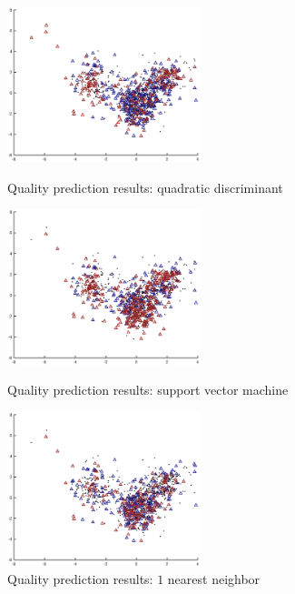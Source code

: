 \documentclass[twoside]{article}
\begin{document}
\begin{multicols}{2}
\begin{figure}[H]
\centering
\includegraphics[width=0.5\textwidth]{rankpca/quaddiscr}
\caption{Quality prediction results: quadratic discriminant}
\includegraphics[width=0.5\textwidth]{rankpca/svm}
\caption{Quality prediction results: support vector machine}
\includegraphics[width=0.5\textwidth]{rankpca/knn1}
\caption{Quality prediction results: $1$ nearest neighbor}

\end{figure}



\end{multicols}
\end{document}
